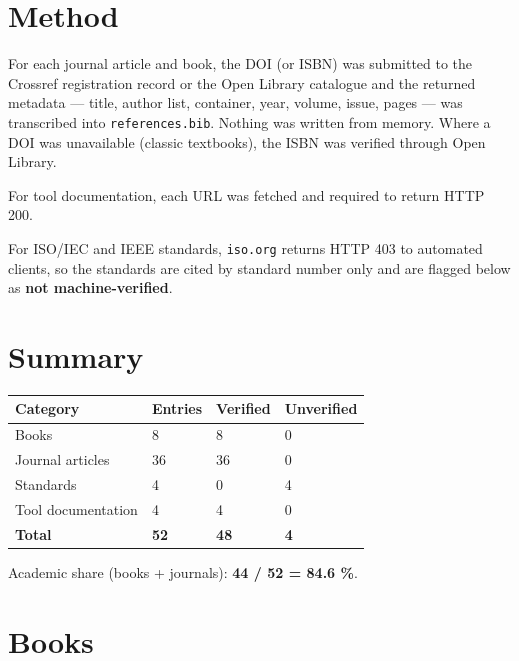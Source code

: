 \documentclass[
  12pt,
]{report}
\begin{document}
\section{Method}\label{method}

For each journal article and book, the DOI (or ISBN) was submitted to
the Crossref registration record or the Open Library catalogue and the
returned metadata --- title, author list, container, year, volume,
issue, pages --- was transcribed into \texttt{references.bib}. Nothing
was written from memory. Where a DOI was unavailable (classic
textbooks), the ISBN was verified through Open Library.

For tool documentation, each URL was fetched and required to return HTTP
200.

For ISO/IEC and IEEE standards, \texttt{iso.org} returns HTTP 403 to
automated clients, so the standards are cited by standard number only
and are flagged below as \textbf{not machine-verified}.

\section{Summary}\label{summary}

\begin{longtable}[]{@{}llll@{}}
\toprule\noalign{}
Category & Entries & Verified & Unverified \\
\midrule\noalign{}
\endhead
\bottomrule\noalign{}
\endlastfoot
Books & 8 & 8 & 0 \\
Journal articles & 36 & 36 & 0 \\
Standards & 4 & 0 & 4 \\
Tool documentation & 4 & 4 & 0 \\
\textbf{Total} & \textbf{52} & \textbf{48} & \textbf{4} \\
\end{longtable}

Academic share (books + journals): \textbf{44 / 52 = 84.6 \%}.

\section{Books}\label{books}
\end{document}
